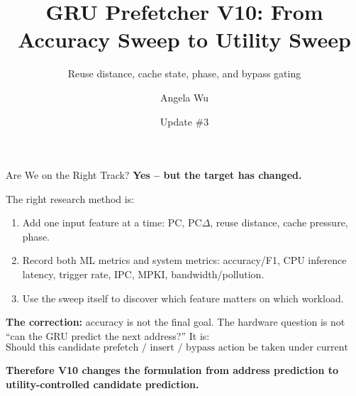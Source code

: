 \documentclass[10pt,aspectratio=169]{beamer}
\title{GRU Prefetcher V10: From Accuracy Sweep to Utility Sweep}
\subtitle{Reuse distance, cache state, phase, and bypass gating}
\author{Angela Wu}
\institute{CPU Cache + NN Prefetching Research}
\date{Update \#3}
\begin{document}
\begin{frame}
  \titlepage
\end{frame}

\begin{frame}{Are We on the Right Track?}
  \textbf{Yes -- but the target has changed.}

  \vspace{0.4em}
  The right research method is:
  \begin{enumerate}
    \item Add one input feature at a time: PC, PC$\Delta$, reuse distance, cache pressure, phase.
    \item Record both ML metrics and system metrics: accuracy/F1, CPU inference latency, trigger rate, IPC, MPKI, bandwidth/pollution.
    \item Use the sweep itself to discover which feature matters on which workload.
  \end{enumerate}

  \vspace{0.5em}
  \textbf{The correction:} accuracy is not the final goal.
  The hardware question is not ``can the GRU predict the next address?''
  It is:
  \[
      \text{Should this candidate prefetch / insert / bypass action be taken under current cache resources?}
  \]

  \vspace{0.4em}
  \textbf{Therefore V10 changes the formulation from address prediction to utility-controlled candidate prediction.}
\end{frame}
\end{document}
